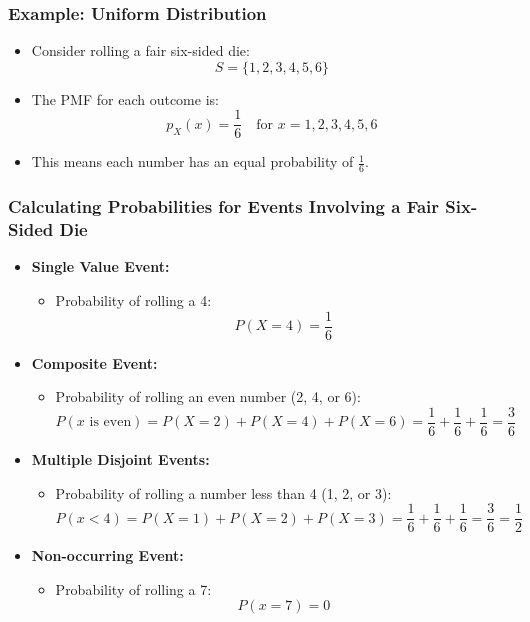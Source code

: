 \documentclass[handout]{beamer} %
\begin{document}
\begin{frame}
\frametitle{Example: Uniform Distribution}
    \begin{itemize}
        \item Consider rolling a fair six-sided die: \pause
        \[
        S = \{1, 2, 3, 4, 5, 6\}
        \] \pause
        \item The PMF for each outcome is: \pause
        \[
        p_X(x) = \frac{1}{6} \quad \text{for } x = 1, 2, 3, 4, 5, 6
        \] \pause
        \item This means each number has an equal probability of \( \frac{1}{6} \).
    \end{itemize}
\end{frame}

\begin{frame}
\frametitle{Calculating Probabilities for Events Involving a Fair Six-Sided Die}
    \begin{itemize}
        \item \textbf{Single Value Event:} \pause
        \begin{itemize}
            \item Probability of rolling a 4: \pause
            \[
            P(X = 4) = \frac{1}{6}
            \]
        \end{itemize}
        
        \item \textbf{Composite Event:} \pause
        \begin{itemize}
            \item Probability of rolling an even number (2, 4, or 6): \pause
            \[
            P(x \text{ is even}) = P(X = 2) + P(X = 4) + P(X = 6) = \frac{1}{6} + \frac{1}{6} + \frac{1}{6} = \frac{3}{6}
            \]
        \end{itemize}
        
        \item \textbf{Multiple Disjoint Events:} \pause
        \begin{itemize}
            \item Probability of rolling a number less than 4 (1, 2, or 3): \pause
            \[
            P(x < 4) = P(X = 1) + P(X = 2) + P(X = 3) = \frac{1}{6} + \frac{1}{6} + \frac{1}{6} = \frac{3}{6} = \frac{1}{2}
            \]
        \end{itemize}

        \item \textbf{Non-occurring Event:} \pause
        \begin{itemize}
            \item Probability of rolling a 7: \pause
            \[
            P(x = 7) = 0
            \]
        \end{itemize}
    \end{itemize}
\end{frame}
\end{document}
